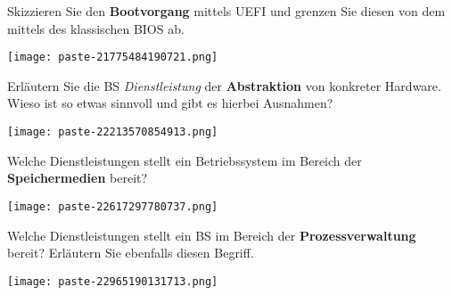 \documentclass{article}
\begin{document}
\begin{tcolorbox}[colback=white!10!white,colframe=lightgray!75!black,
  savelowerto=\jobname_ex.tex,breakable,enhanced,lines before break=40]

\begin{center}
Skizzieren Sie den 
\textbf{Bootvorgang
} mittels UEFI und grenzen Sie diesen von dem mittels des klassischen BIOS ab.

\end{center}

\tcblower

\justifying
\texttt{[image: paste-21775484190721.png]}

\end{tcolorbox}
\begin{tcolorbox}[colback=white!10!white,colframe=lightgray!75!black,
  savelowerto=\jobname_ex.tex,breakable,enhanced,lines before break=40]

\begin{center}
Erläutern Sie die BS
\textit{Dienstleistung
}der 
\textbf{Abstraktion
}von konkreter Hardware. Wieso ist so etwas sinnvoll und gibt es hierbei Ausnahmen?

\end{center}

\tcblower

\justifying
\texttt{[image: paste-22213570854913.png]}

\end{tcolorbox}
\begin{tcolorbox}[colback=white!10!white,colframe=lightgray!75!black,
  savelowerto=\jobname_ex.tex,breakable,enhanced,lines before break=40]

\begin{center}
Welche Dienstleistungen stellt ein Betriebssystem im Bereich der 
\textbf{Speichermedien
} bereit?

\end{center}

\tcblower

\justifying
\texttt{[image: paste-22617297780737.png]}

\end{tcolorbox}
\begin{tcolorbox}[colback=white!10!white,colframe=lightgray!75!black,
  savelowerto=\jobname_ex.tex,breakable,enhanced,lines before break=40]

\begin{center}
Welche Dienstleistungen stellt ein BS im Bereich der 
\textbf{Prozessverwaltung
}bereit? Erläutern Sie ebenfalls diesen Begriff.

\end{center}

\tcblower

\justifying
\texttt{[image: paste-22965190131713.png]}

\end{tcolorbox}
\end{document}
